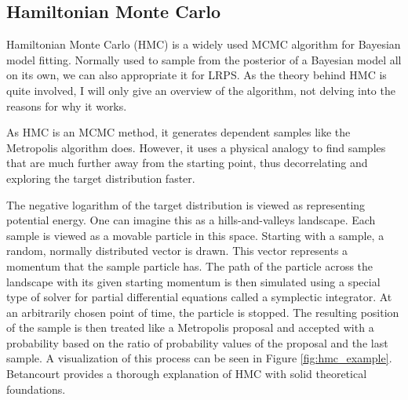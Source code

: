 \documentclass[12pt, a4paper]{report}
\begin{document}
\subsection{Hamiltonian Monte Carlo}
Hamiltonian Monte Carlo (HMC) is a widely used MCMC algorithm for Bayesian model fitting.
Normally used to sample from the posterior of a Bayesian model all on its own, we can also appropriate it for LRPS.
As the theory behind HMC is quite involved, I will only give an overview of the algorithm, not delving into the reasons for why it works.

As HMC is an MCMC method, it generates dependent samples like the Metropolis algorithm does.
However, it uses a physical analogy to find samples that are much further away from the starting point, thus decorrelating and exploring the target distribution faster.

The negative logarithm of the target distribution is viewed as representing potential energy.
One can imagine this as a hills-and-valleys landscape.
Each sample is viewed as a movable particle in this space.
Starting with a sample, a random, normally distributed vector is drawn.
This vector represents a momentum that the sample particle has.
The path of the particle across the landscape with its given starting momentum is then simulated using a special type of solver for partial differential equations called a symplectic integrator.
At an arbitrarily chosen point of time, the particle is stopped.
The resulting position of the sample is then treated like a Metropolis proposal and accepted with a probability based on the ratio of probability values of the proposal and the last sample.
A visualization of this process can be seen in Figure \ref{fig:hmc_example}.
Betancourt \cite{hmc} provides a thorough explanation of HMC with solid theoretical foundations.
\end{document}
